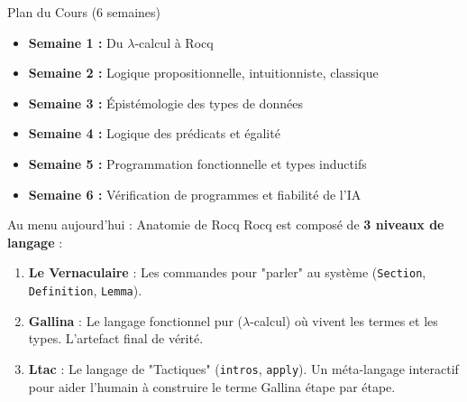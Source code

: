 \documentclass[aspectratio=169]{beamer}
\begin{document}
\begin{frame}{Plan du Cours (6 semaines)}
  \begin{itemize}
    \item \textbf{Semaine 1 :} Du $\lambda$-calcul à Rocq
    \item \textbf{Semaine 2 :} Logique propositionnelle, intuitionniste, classique
    \item \textbf{Semaine 3 :} Épistémologie des types de données
    \item \textbf{Semaine 4 :} Logique des prédicats et égalité
    \item \textbf{Semaine 5 :} Programmation fonctionnelle et types inductifs
    \item \textbf{Semaine 6 :} Vérification de programmes et fiabilité de l'IA
  \end{itemize}
\end{frame}

\begin{frame}{Au menu aujourd'hui : Anatomie de Rocq}
  Rocq est composé de \textbf{3 niveaux de langage} :
  \vspace{0.3cm}
  \begin{enumerate}
    \item \textbf{Le Vernaculaire} : Les commandes pour "parler" au système (\texttt{Section}, \texttt{Definition}, \texttt{Lemma}).
    \item \textbf{Gallina} : Le langage fonctionnel pur ($\lambda$-calcul) où vivent les termes et les types. L'artefact final de vérité.
    \item \textbf{Ltac} : Le langage de "Tactiques" (\texttt{intros}, \texttt{apply}). Un méta-langage interactif pour aider l'humain à construire le terme Gallina étape par étape.
  \end{enumerate}
\end{frame}
\end{document}
